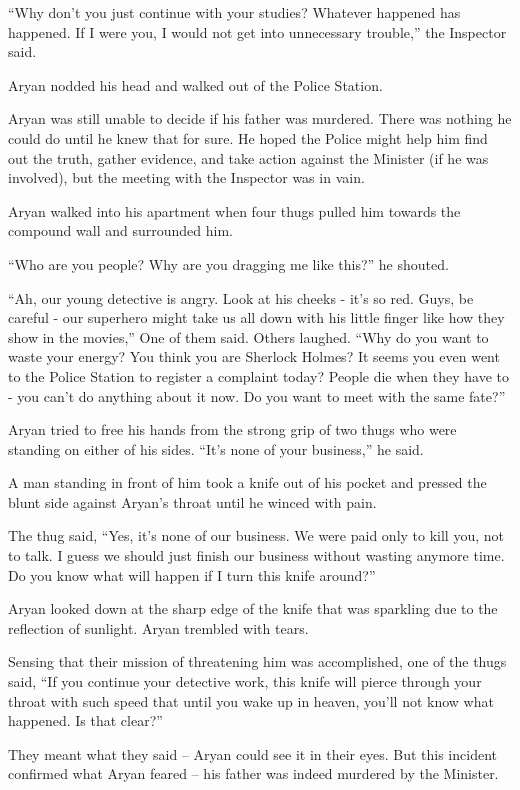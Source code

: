 “Why don't you just continue with your studies? Whatever happened has happened.
If I were you, I would not get into unnecessary trouble,” the Inspector said.

Aryan nodded his head and walked out of the Police Station.

Aryan was still unable to decide if his father was murdered. There was nothing
he could do until he knew that for sure. He hoped the Police might help him find
out the truth, gather evidence, and take action against the Minister (if he was
involved), but the meeting with the Inspector was in vain.

Aryan walked into his apartment when four thugs pulled him towards the compound
wall and surrounded him.

“Who are you people? Why are you dragging me like this?” he shouted.

“Ah, our young detective is angry. Look at his cheeks - it's so red. Guys, be
careful - our superhero might take us all down with his little finger like how
they show in the movies,” One of them said. Others laughed. “Why do you want to
waste your energy? You think you are Sherlock Holmes? It seems you even went to
the Police Station to register a complaint today? People die when they have to -
you can't do anything about it now. Do you want to meet with the same fate?”

Aryan tried to free his hands from the strong grip of two thugs who were
standing on either of his sides. “It's none of your business,” he said.

A man standing in front of him took a knife out of his pocket and pressed the
blunt side against Aryan's throat until he winced with pain.

The thug said, “Yes, it's none of our business. We were paid only to kill you,
not to talk. I guess we should just finish our business without wasting anymore
time. Do you know what will happen if I turn this knife around?”

Aryan looked down at the sharp edge of the knife that was sparkling due to the
reflection of sunlight. Aryan trembled with tears.

Sensing that their mission of threatening him was accomplished, one of the thugs
said, “If you continue your detective work, this knife will pierce through your
throat with such speed that until you wake up in heaven, you'll not know what
happened. Is that clear?”

They meant what they said – Aryan could see it in their eyes. But this incident
confirmed what Aryan feared – his father was indeed murdered by the Minister.